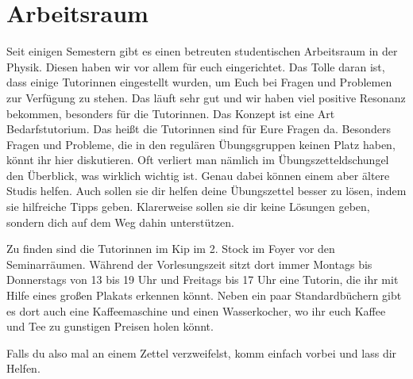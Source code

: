 \section{Arbeitsraum}
\label{sec:arbeitsraum}
Seit einigen Semestern gibt es einen betreuten studentischen Arbeitsraum in der Physik. Diesen haben wir vor allem für euch eingerichtet. Das Tolle daran ist, dass einige Tutorinnen eingestellt wurden, um Euch bei Fragen und Problemen zur Verfügung zu stehen. Das läuft sehr gut und wir haben viel positive Resonanz bekommen, besonders für die Tutorinnen. Das Konzept ist eine Art Bedarfstutorium. Das heißt die Tutorinnen sind für Eure Fragen da. Besonders Fragen und Probleme, die in den regulären Übungsgruppen keinen Platz haben, könnt ihr hier diskutieren. Oft verliert man nämlich im Übungszetteldschungel den Überblick, was wirklich wichtig ist. Genau dabei können einem aber ältere Studis helfen. Auch sollen sie dir helfen deine Übungszettel besser zu lösen, indem sie hilfreiche Tipps geben. Klarerweise sollen sie dir keine Lösungen geben, sondern dich auf dem Weg dahin unterstützen.

Zu finden sind die Tutorinnen im Kip im 2. Stock im Foyer vor den Seminarräumen. Während der Vorlesungszeit sitzt dort immer Montags bis Donnerstags von 13 bis 19 Uhr und Freitags bis 17 Uhr eine Tutorin, die ihr mit Hilfe eines großen Plakats erkennen könnt. Neben ein paar Standardbüchern gibt es dort auch eine Kaffeemaschine und einen Wasserkocher, wo ihr euch Kaffee und Tee zu gunstigen Preisen holen könnt.

Falls du also mal an einem Zettel verzweifelst, komm einfach vorbei und lass dir Helfen.
